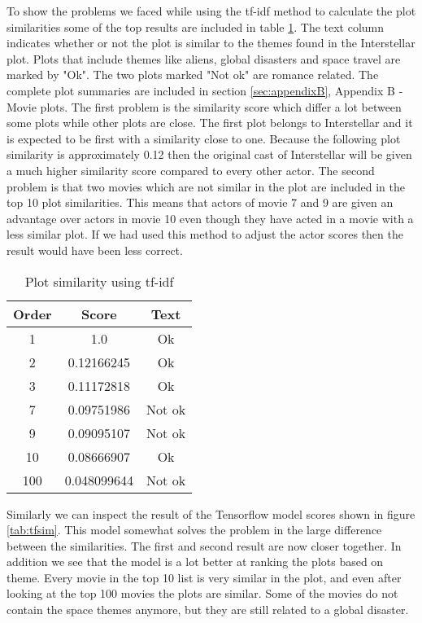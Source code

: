 To show the problems we faced while using the tf-idf method to calculate the plot similarities some of the top results are included in table \ref{tab:tfidf}. The text column indicates whether or not the plot is similar to the themes found in the Interstellar plot. Plots that include themes like aliens, global disasters and space travel are marked by "Ok". The two plots marked "Not ok" are romance related. The complete plot summaries are included in section \ref{sec:appendixB}, Appendix B - Movie plots. The first problem is the similarity score which differ a lot between some plots while other plots are close. The first plot belongs to Interstellar and it is expected to be first with a similarity close to one. Because the following plot similarity is approximately 0.12 then the original cast of Interstellar will be given a much higher similarity score compared to every other actor. The second problem is that two movies which are not similar in the plot are included in the top 10 plot similarities. This means that actors of movie 7 and 9 are given an advantage over actors in movie 10 even though they have acted in a movie with a less similar plot. If we had used this method to adjust the actor scores then the result would have been less correct.
\begin{table}[H]
    \centering
        \begin{tabular}{ |c|c|c| } 
            \hline
            \textbf{Order} & \textbf{Score} & \textbf{Text} \\ 
            \hline
            1 & 1.0 & Ok \\
            2 & 0.12166245 & Ok \\
            3 & 0.11172818 & Ok \\
            7 & 0.09751986 & Not ok  \\
            9 & 0.09095107 & Not ok \\
            10 & 0.08666907 & Ok \\
            100 & 0.048099644 & Not ok \\
            \hline
        \end{tabular}
        \caption{Plot similarity using tf-idf}
        \label{tab:tfidf}
\end{table}
    
Similarly we can inspect the result of the Tensorflow model scores shown in figure \ref{tab:tfsim}. This model somewhat solves the problem in the large difference between the similarities. The first and second result are now closer together. In addition we see that the model is a lot better at ranking the plots based on theme. Every movie in the top 10 list is very similar in the plot, and even after looking at the top 100 movies the plots are similar. Some of the movies do not contain the space themes anymore, but they are still related to a global disaster.

